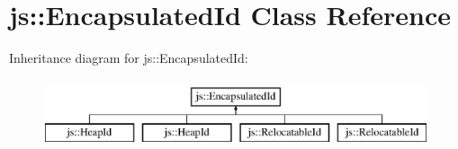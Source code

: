 \hypertarget{classjs_1_1_encapsulated_id}{\section{js\-:\-:Encapsulated\-Id Class Reference}
\label{classjs_1_1_encapsulated_id}
}
Inheritance diagram for js\-:\-:Encapsulated\-Id\-:\begin{figure}[H]
\begin{center}
\leavevmode
\includegraphics[height=2.000000cm]{classjs_1_1_encapsulated_id}
\end{center}
\end{figure}
